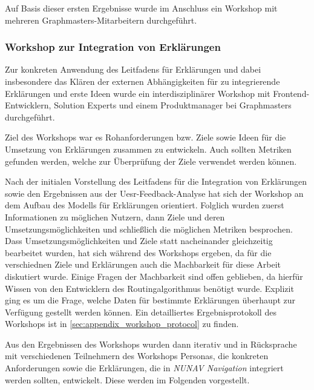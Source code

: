 \bigskip

Auf Basis dieser ersten Ergebnisse wurde im Anschluss ein Workshop mit mehreren Graphmasters-Mitarbeitern durchgeführt.

\subsubsection{Workshop zur Integration von Erklärungen}

Zur konkreten Anwendung des Leitfadens für Erklärungen und dabei insbesondere das Klären der externen Abhängigkeiten für zu integrierende Erklärungen und erste Ideen wurde ein interdisziplinärer Workshop mit Frontend-Entwicklern, \glqq Solution Experts\grqq{} und einem Produktmanager bei Graphmasters durchgeführt.

Ziel des Workshops war es Rohanforderungen bzw. Ziele sowie Ideen für die Umsetzung von Erklärungen zusammen zu entwickeln. Auch sollten Metriken gefunden werden, welche zur Überprüfung der Ziele verwendet werden können.

Nach der initialen Vorstellung des Leitfadens für die Integration von Erklärungen sowie den Ergebnissen aus der Uesr-Feedback-Analyse hat sich der Workshop an dem Aufbau des Modells für Erklärungen orientiert. Folglich wurden zuerst Informationen zu möglichen Nutzern, dann Ziele und deren Umsetzungsmöglichkeiten und schließlich die möglichen Metriken besprochen. Dass Umsetzungsmöglichkeiten und Ziele statt nacheinander gleichzeitig bearbeitet wurden, hat sich während des Workshops ergeben, da für die verschiednen Ziele und Erklärungen auch die Machbarkeit für diese Arbeit diskutiert wurde. Einige Fragen der Machbarkeit sind offen geblieben, da hierfür Wissen von den Entwicklern des Routingalgorithmus benötigt wurde. Explizit ging es um die Frage, welche Daten für bestimmte Erklärungen überhaupt zur Verfügung gestellt werden können. Ein detailliertes Ergebnisprotokoll des Workshops ist in \autoref{sec:appendix_workshop_protocol} zu finden.

Aus den Ergebnissen des Workshops wurden dann iterativ und in Rücksprache mit verschiedenen Teilnehmern des Workshops Personas, die konkreten Anforderungen sowie die Erklärungen, die in \textit{NUNAV Navigation} integriert werden sollten, entwickelt. Diese werden im Folgenden vorgestellt.